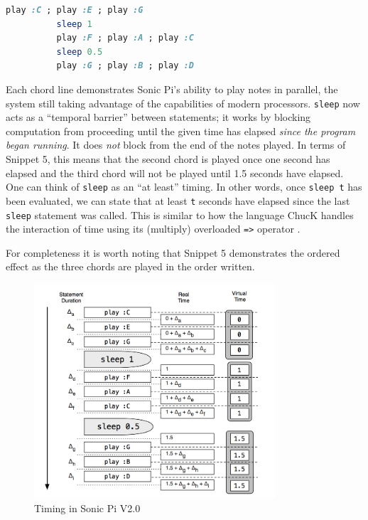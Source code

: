 \documentclass[11pt]{scrartcl}
\begin{document}
\begin{minipage}{\textwidth}
	\begin{lstlisting}[language = ruby]
		  play :C ; play :E ; play :G
		  sleep 1
		  play :F ; play :A ; play :C
		  sleep 0.5
		  play :G ; play :B ; play :D
	\end{lstlisting}
\end{minipage}

Each chord line demonstrates Sonic Pi's ability to play notes in parallel, the 
system still taking advantage of the capabilities of modern processors. \texttt
{sleep} now acts as a ``temporal barrier'' between statements; it works by 
blocking computation from proceeding until the given time has elapsed \emph{
since the program began running}. It does \emph{not} block from the end of the 
notes played. In terms of Snippet 5, this means that the second chord is 
played once one second has elapsed and the third chord will not be played 
until 1.5 seconds have elapsed. One can think of \texttt{sleep} as an ``at 
least'' timing. In other words, once \texttt{sleep t} has been evaluated, we 
can state that at least \texttt{t} seconds have elapsed since the last \texttt{
sleep} statement was called. This is similar to how the language ChucK handles 
the interaction of time using its (multiply) overloaded \texttt{=>} operator 
\cite{WC03}.

For completeness it is worth noting that Snippet 5 demonstrates the ordered 
effect as the three chords are played in the order written.

\begin{figure}[ht]
	\centering
	\includegraphics[width=0.8\textwidth]{images/sonic-two.png}
	\caption{Timing in Sonic Pi V2.0 \cite{AOB14}}
\end{figure}
\end{document}
